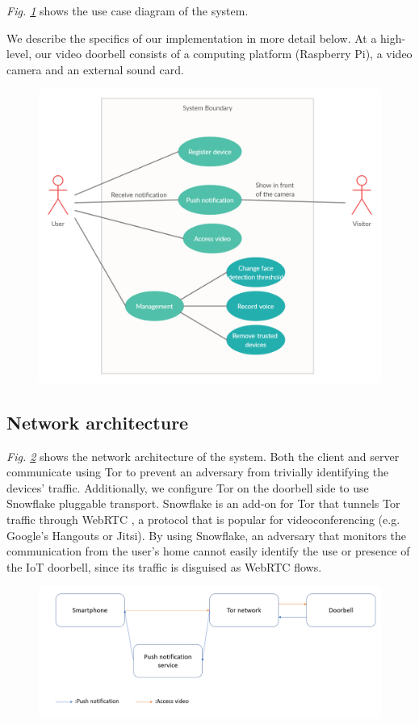 \textit{Fig. \ref{fig:usecase}} shows the use case diagram of the system.

We describe the specifics of our implementation in more detail below. At a high-level, our video doorbell consists of a computing platform (Raspberry Pi), a video camera and an external sound card.

\begin{figure}
	\includegraphics[width=\linewidth]{Use_case_diagram.png}
	\caption{}
	\label{fig:usecase}
\end{figure}

\subsection{Network architecture}
\textit{Fig. \ref{fig:architecture}} shows the network architecture of the system. Both the client and server communicate using Tor to prevent an adversary from trivially identifying the devices' traffic. Additionally, we configure Tor on the doorbell side to use Snowflake pluggable transport. Snowflake is an add-on for Tor that tunnels Tor traffic through WebRTC \cite{snowflake} \cite{macmillan2020evaluating}, a protocol that is popular for videoconferencing (e.g. Google's Hangouts or Jitsi). By using Snowflake, an adversary that monitors the communication from the user's home cannot easily identify the use or presence of the IoT doorbell, since its traffic is disguised as WebRTC flows.

\begin{figure}
	\includegraphics[width=\linewidth]{architecture.png}
	\caption{}
	\label{fig:architecture}
\end{figure}

